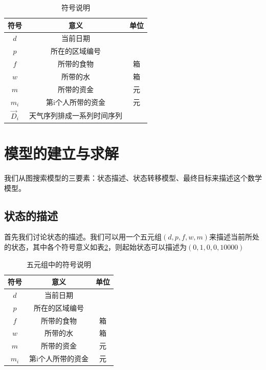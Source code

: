 \documentclass[withoutpreface,bwprint]{cumcmthesis} %
\begin{document}
\begin{table}[!htbp]
    \caption{符号说明}\label{tab:001} \centering
    \begin{tabular}{ccc}
        \toprule[1.5pt]
        符号 & 意义 & 单位\\
        \midrule[1pt]
        $d$ & 当前日期 & \\
        $p$ & 所在的区域编号 & \\
        $f$ & 所带的食物 & 箱\\
        $w$ & 所带的水 & 箱\\
        $m$ & 所带的资金 & 元\\
        $m_i$ & 第i个人所带的资金 & 元\\
        \(\overrightarrow{D}_i\) & 天气序列排成一系列时间序列 & \\
        \bottomrule[1.5pt]
    \end{tabular}
\end{table}

\section{模型的建立与求解}

我们从图搜索模型的三要素：状态描述、状态转移模型、最终目标来描述这个数学模型。

\subsection{状态的描述}
首先我们讨论状态的描述。我们可以用一个五元组\((d,p,f,w,m)\)来描述当前所处的状态，其中各个符号意义如表\ref{zt}，则起始状态可以描述为\((0,1,0,0,10000)\)
\begin{table}[!htbp]
    \caption{五元组中的符号说明}\label{tab:001} \centering
    \begin{tabular}{ccc}
        \toprule[1.5pt]
        符号 & 意义 & 单位\\
        \midrule[1pt]
        $d$ & 当前日期 & \\
        $p$ & 所在的区域编号 & \\
        $f$ & 所带的食物 & 箱\\
        $w$ & 所带的水 & 箱\\
        $m$ & 所带的资金 & 元\\
        $m_i$ & 第i个人所带的资金 & 元\\
        \bottomrule[1.5pt]
    \end{tabular}
    \label{zt}
\end{table}
\end{document}
